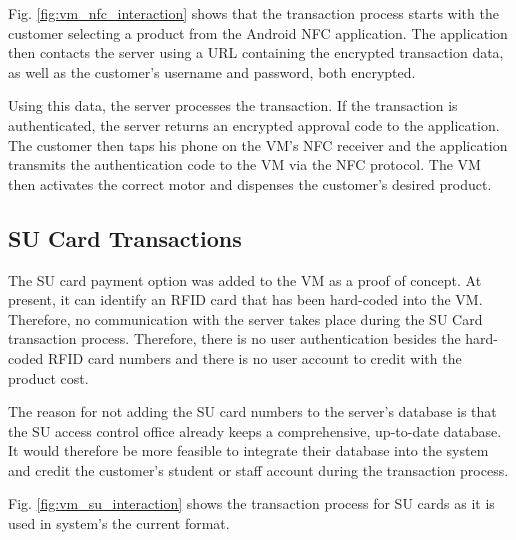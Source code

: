 Fig. \ref{fig:vm_nfc_interaction} shows that the transaction process starts with the
customer selecting a product from the Android NFC application. The application
then contacts the server using a URL containing the encrypted transaction data,
as well as the customer's username and password, both encrypted.

Using this data, the server processes the transaction. If the transaction is
authenticated, the server returns an encrypted approval code to the application.
The customer then taps his phone on the VM's NFC receiver
and the application transmits the authentication code to the VM
via the NFC protocol. The VM then activates the correct motor and dispenses the
customer's desired product.

\subsection{SU Card Transactions}
\label{sec:su-card}

The SU card payment option was added to the VM as a proof of concept. At present, it can
identify an RFID card that has been hard-coded into the VM. Therefore, no communication
with the server takes place during the SU Card transaction process. Therefore, there is
no user authentication besides the hard-coded RFID card numbers and there is no user
account to credit with the product cost.

The reason for not adding the SU card numbers to the server's database is that
the SU access control office already keeps a comprehensive, up-to-date database. It
would therefore be more feasible to integrate their database into the system and credit
the customer's student or staff account during the transaction process.

Fig. \ref{fig:vm_su_interaction} shows the transaction process for SU cards as it is
used in system's the current format. 

